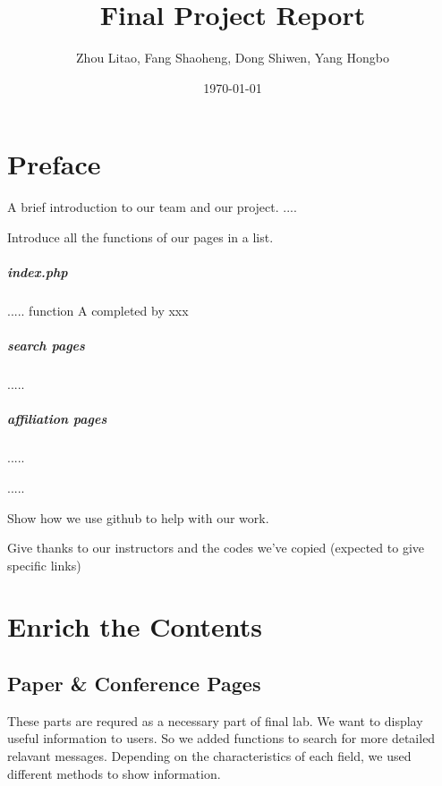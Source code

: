 \documentclass{book}
\begin{document}
\title{Final Project Report}
\author{Zhou Litao, Fang Shaoheng, Dong Shiwen, Yang Hongbo}
\date{\today}


\maketitle


\tableofcontents





\frontmatter
\chapter {Preface}

A brief introduction to our team and our project. .... 

Introduce all the functions of our pages in a list. 

\paragraph{index.php}..... function A completed by xxx

\paragraph{search pages}.....

\paragraph{affiliation pages}.....

.....

Show how we use github to help with our work.

Give thanks to our instructors and the codes we've copied (expected to give specific links)


\mainmatter
\chapter {Enrich the Contents}

\section {Paper \& Conference Pages}

These parts are requred as a necessary part of final lab. We want to display useful information to users. So we added functions to search for more detailed relavant messages.
Depending on the characteristics of each field, we used different methods to show information.
\end{document}
